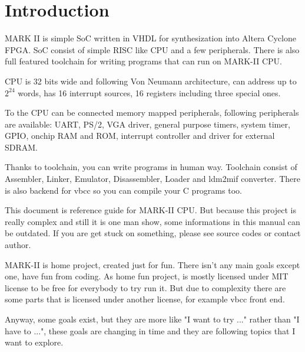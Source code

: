 \section{Introduction}

MARK II is simple SoC written in VHDL for synthesization into Altera Cyclone
FPGA. SoC consist of simple RISC like CPU and a few peripherals. There is also
full featured toolchain for writing programs that can run on MARK-II CPU.

CPU is 32 bits wide and following Von Neumann architecture, can address up to
$2^{24}$ words, has 16 interrupt sources, 16 registers including three special
ones.

To the CPU can be connected memory mapped peripherals, following peripherals
are available: UART, PS/2, VGA driver, general purpose timers, system timer,
GPIO, onchip RAM and ROM, interrupt controller and driver for external SDRAM.

Thanks to toolchain, you can write programs in human way. Toolchain consist of
Assembler, Linker, Emulator, Disassembler, Loader and ldm2mif converter. There is
also backend for vbcc so you can compile your C programs too.

This document is reference guide for MARK-II CPU. But because this project is really
complex and still it is one man show, some informations in this manual can be
outdated. If you are get stuck on something, please see source codes or
contact author.

MARK-II is home project, created just for fun. There isn't any main goals
except one, have fun from coding. As home fun project, is mostly licensed under
MIT license to be free for everybody to try run it. But due to complexity there
are some parts that is licensed under another license, for example vbcc front
end.

Anyway, some goals exist, but they are more like "I want to try ..." rather than
"I have to ...", these goals are changing in time and they are following topics
that I want to explore.
